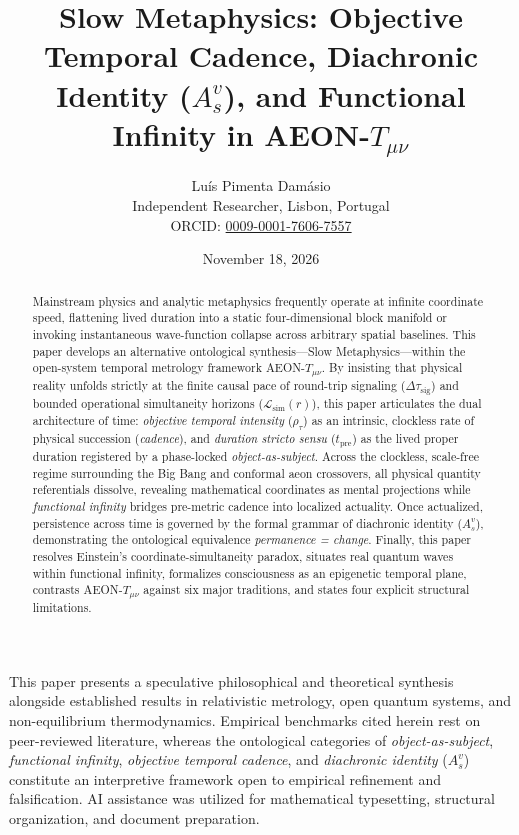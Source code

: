 \documentclass[11pt,a4paper]{article}
\title{\textbf{Slow Metaphysics: Objective Temporal Cadence, Diachronic Identity ($A_s^v$), and Functional Infinity in AEON-$T_{\mu\nu}$}}
\author{Lu\'is Pimenta Dam\'asio\\
\small Independent Researcher, Lisbon, Portugal\\
\small ORCID: \href{https://orcid.org}{0009-0001-7606-7557}}
\date{November 18, 2026}
\begin{document}
\maketitle

\begin{abstract}
Mainstream physics and analytic metaphysics frequently operate at infinite coordinate speed, flattening lived duration into a static four-dimensional block manifold or invoking instantaneous wave-function collapse across arbitrary spatial baselines. This paper develops an alternative ontological synthesis---Slow Metaphysics---within the open-system temporal metrology framework AEON-$T_{\mu\nu}$. By insisting that physical reality unfolds strictly at the finite causal pace of round-trip signaling ($\Delta\tau_{\mathrm{sig}}$) and bounded operational simultaneity horizons ($\mathcal{L}_{\mathrm{sim}}(r)$), this paper articulates the dual architecture of time: \emph{objective temporal intensity} ($\rho_\tau$) as an intrinsic, clockless rate of physical succession (\emph{cadence}), and \emph{duration stricto sensu} ($t_{\mathrm{pre}}$) as the lived proper duration registered by a phase-locked \emph{object-as-subject}. Across the clockless, scale-free regime surrounding the Big Bang and conformal aeon crossovers, all physical quantity referentials dissolve, revealing mathematical coordinates as mental projections while \emph{functional infinity} bridges pre-metric cadence into localized actuality. Once actualized, persistence across time is governed by the formal grammar of diachronic identity ($A_s^v$), demonstrating the ontological equivalence \emph{permanence = change}. Finally, this paper resolves Einstein's coordinate-simultaneity paradox, situates real quantum waves within functional infinity, formalizes consciousness as an epigenetic temporal plane, contrasts AEON-$T_{\mu\nu}$ against six major traditions, and states four explicit structural limitations.
\end{abstract}

\begin{tcolorbox}[colback=gray!6,colframe=gray!50,title=\textbf{Epistemic Status \& AI Collaboration Disclosure}]
\small
This paper presents a speculative philosophical and theoretical synthesis alongside established results in relativistic metrology, open quantum systems, and non-equilibrium thermodynamics. Empirical benchmarks cited herein rest on peer-reviewed literature, whereas the ontological categories of \emph{object-as-subject}, \emph{functional infinity}, \emph{objective temporal cadence}, and \emph{diachronic identity} ($A_s^v$) constitute an interpretive framework open to empirical refinement and falsification. AI assistance was utilized for mathematical typesetting, structural organization, and document preparation.
\end{tcolorbox}
\end{document}
